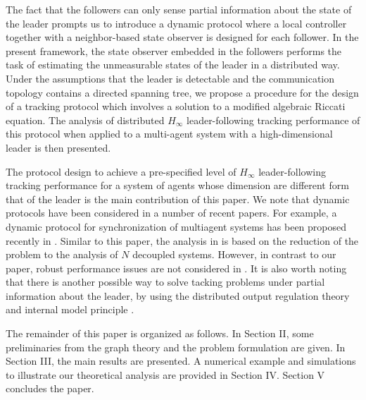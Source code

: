 \documentclass[a4paper,10pt,onecolumn]{article}
\begin{document}
The fact that the followers can only sense partial information about the
state of the leader prompts us to introduce a dynamic protocol where a
local controller together with a neighbor-based state observer is
designed for each follower. In the present framework, the state observer
embedded in the followers performs the task of estimating the unmeasurable
states of the leader in a distributed way. Under the
assumptions that the leader is detectable and the communication
topology contains a directed spanning tree, we propose a procedure
for  the design of a tracking protocol which involves a solution to a
modified algebraic Riccati equation. The analysis of distributed
$H_{\infty}$ leader-following tracking performance of this protocol when applied
to a multi-agent system with a high-dimensional leader is then
presented.

The protocol design to achieve a pre-specified level of $H_{\infty}$
leader-following tracking performance for a system of agents whose
dimension are different form that of the leader is the main
contribution of this paper. We note that dynamic protocols have been
considered in a number of recent papers. For example, a dynamic protocol
for synchronization of multiagent systems has been proposed recently in
\cite{TTM-2013}. Similar to this paper, the analysis in \cite{TTM-2013} is
based on the reduction of the problem to the analysis of $N$ decoupled
systems. However, in contrast to our paper, robust performance issues are
not considered in \cite{TTM-2013}.  It is also worth noting that there is
another possible way to solve tacking problems under partial information
about the leader, by using the distributed output regulation
theory and internal model principle \cite{Hong-IJRNC2012}.

The remainder of this paper is organized as follows. In
Section II, some preliminaries from the graph theory and the problem formulation are
given. In Section III, the main results are presented. A numerical example
and simulations to illustrate our theoretical analysis are provided in
Section IV. Section V concludes the paper.

\par
\end{document}
